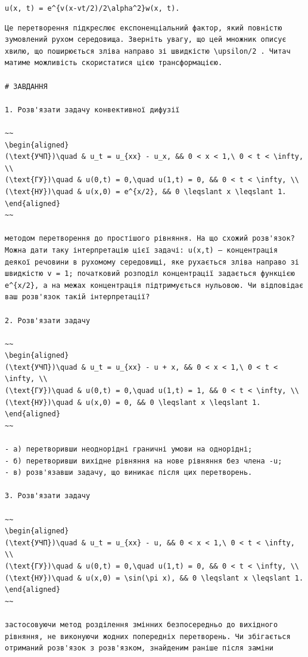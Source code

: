\documentclass[
  ukrainian,
]{article}
\begin{document}
\texttt{u(x,\ t)\ =\ e\^{}\{v(x-vt/2)/2\textbackslash{}alpha\^{}2\}w(x,\ t).}

\begin{verbatim}
Це перетворення підкреслює експоненціальний фактор, який повністю зумовлений рухом середовища. Зверніть увагу, що цей множник описує хвилю, що поширюється зліва направо зі швидкістю \upsilon/2 . Читач матиме можливість скористатися цією трансформацією.

# ЗАВДАННЯ

1. Розв'язати задачу конвективної дифузії

~~
\begin{aligned}
(\text{УЧП})\quad & u_t = u_{xx} - u_x, && 0 < x < 1,\ 0 < t < \infty, \\
(\text{ГУ})\quad & u(0,t) = 0,\quad u(1,t) = 0, && 0 < t < \infty, \\
(\text{НУ})\quad & u(x,0) = e^{x/2}, && 0 \leqslant x \leqslant 1.
\end{aligned}
~~

методом перетворення до простішого рівняння. На що схожий розв'язок? Можна дати таку інтерпретацію цієї задачі: u(x,t) — концентрація деякої речовини в рухомому середовищі, яке рухається зліва направо зі швидкістю v = 1; початковий розподіл концентрації задається функцією e^{x/2}, а на межах концентрація підтримується нульовою. Чи відповідає ваш розв'язок такій інтерпретації?

2. Розв'язати задачу

~~
\begin{aligned}
(\text{УЧП})\quad & u_t = u_{xx} - u + x, && 0 < x < 1,\ 0 < t < \infty, \\
(\text{ГУ})\quad & u(0,t) = 0,\quad u(1,t) = 1, && 0 < t < \infty, \\
(\text{НУ})\quad & u(x,0) = 0, && 0 \leqslant x \leqslant 1.
\end{aligned}
~~

- а) перетворивши неоднорідні граничні умови на однорідні;
- б) перетворивши вихідне рівняння на нове рівняння без члена -u;
- в) розв'язавши задачу, що виникає після цих перетворень.

3. Розв'язати задачу

~~
\begin{aligned}
(\text{УЧП})\quad & u_t = u_{xx} - u, && 0 < x < 1,\ 0 < t < \infty, \\
(\text{ГУ})\quad & u(0,t) = 0,\quad u(1,t) = 0, && 0 < t < \infty, \\
(\text{НУ})\quad & u(x,0) = \sin(\pi x), && 0 \leqslant x \leqslant 1.
\end{aligned}
~~

застосовуючи метод розділення змінних безпосередньо до вихідного рівняння, не виконуючи жодних попередніх перетворень. Чи збігається отриманий розв'язок з розв'язком, знайденим раніше після заміни
\end{verbatim}
\end{document}
